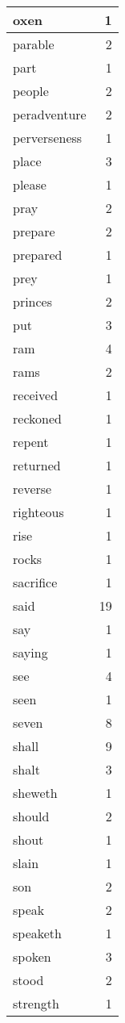 \begin{center}
\begin{longtable}{l|r}
oxen & 1\\ \hline 
parable & 2\\ \hline 
part & 1\\ \hline 
people & 2\\ \hline 
peradventure & 2\\ \hline 
perverseness & 1\\ \hline 
place & 3\\ \hline 
please & 1\\ \hline 
pray & 2\\ \hline 
prepare & 2\\ \hline 
prepared & 1\\ \hline 
prey & 1\\ \hline 
princes & 2\\ \hline 
put & 3\\ \hline 
ram & 4\\ \hline 
rams & 2\\ \hline 
received & 1\\ \hline 
reckoned & 1\\ \hline 
repent & 1\\ \hline 
returned & 1\\ \hline 
reverse & 1\\ \hline 
righteous & 1\\ \hline 
rise & 1\\ \hline 
rocks & 1\\ \hline 
sacrifice & 1\\ \hline 
said & 19\\ \hline 
say & 1\\ \hline 
saying & 1\\ \hline 
see & 4\\ \hline 
seen & 1\\ \hline 
seven & 8\\ \hline 
shall & 9\\ \hline 
shalt & 3\\ \hline 
sheweth & 1\\ \hline 
should & 2\\ \hline 
shout & 1\\ \hline 
slain & 1\\ \hline 
son & 2\\ \hline 
speak & 2\\ \hline 
speaketh & 1\\ \hline 
spoken & 3\\ \hline 
stood & 2\\ \hline 
strength & 1\\ \hline 

\end{longtable}
\end{center}
